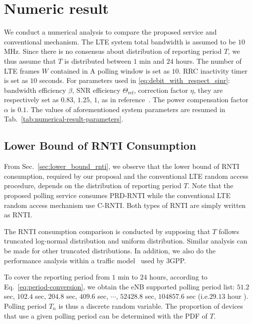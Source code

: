 \section{Numeric result}
\label{sec:numerical-result}
We conduct a numerical analysis to compare the proposed service and conventional mechanism. The LTE system total bandwidth is assumed to be $10$ MHz. Since there is no consensus about distribution of reporting period $T$, we thus assume that $T$ is distributed between $1$ min and $24$ hours. The number of LTE frames $W$ contained in A polling window is set as $10$. RRC inactivity timer is set as $10$ seconds. For parameters used in \eqref{eq:debit_with_respect_sinr}: bandwidth efficiency $\beta$, SNR efficiency $\Theta_{\text{ref}}$, correction factor $\eta$, they are respectively set as $0.83$, $1.25$, $1$, as in reference~\cite{mogensen2007lte}. The power compensation factor $\alpha$ is $0.1$.
The values of aforementioned system parameters are resumed in Tab.~\ref{tab:numerical-result-parameters}.



\subsection{Lower Bound of RNTI Consumption}
From Sec.~\ref{sec:lower_bound_rnti}, we observe that the lower bound of RNTI consumption, required by our proposal and the conventional LTE random access procedure, depends on the distribution of reporting period $T$. Note that the proposed polling service consumes PRD-RNTI while the conventional LTE random access mechanism use C-RNTI. Both types of RNTI are simply written as RNTI. 

The RNTI consumption comparison is conducted by supposing that $T$ follows truncated log-normal distribution and uniform distribution. Similar analysis can be made for other truncated distributions. In addition, we also do the performance analysis within a traffic model~\cite{3GPP/cellularIoT} used by 3GPP.

To cover the reporting period from $1$ min to $24$ hours, according to Eq.~\eqref{eq:period-conversion}, we obtain the eNB supported polling period list: $51.2$ sec, $102.4$ sec, $204.8$ sec, $409.6$ sec, $\cdots$, $52428.8$ sec, $104857.6$ sec (i.e.$29.13$ hour ). Polling period $T_n$ is thus a discrete random variable. The proportion of devices that use a given polling period can be determined with the PDF of $T$.

